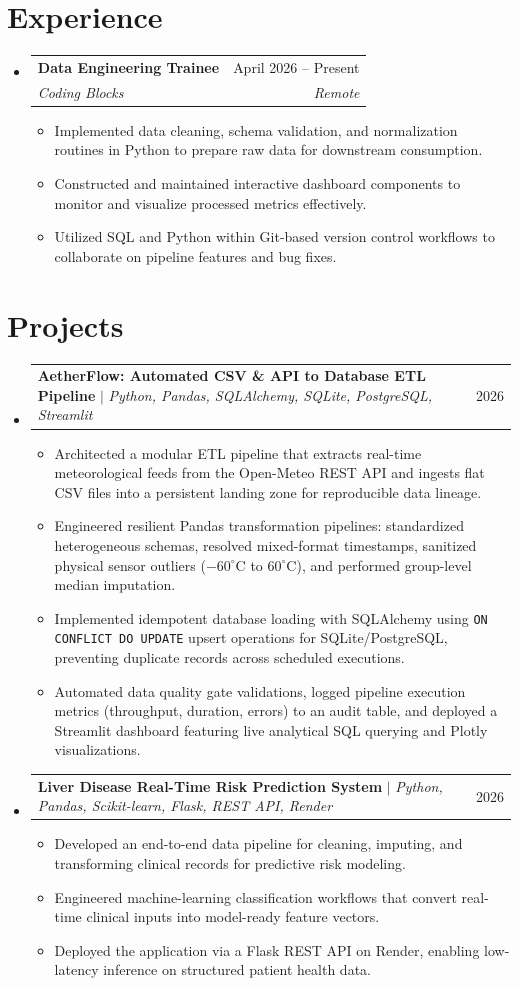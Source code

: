 \documentclass[letterpaper,10pt]{article}
\makeatletter
\newcommand{\resumeItem}[1]{
  \item\small{#1}
}
\newcommand{\resumeSubheading}[4]{
  \item
    \begin{tabular*}{0.98\textwidth}[t]{l@{\extracolsep{\fill}}r}
      \textbf{#1} & \small #2 \\
      \textit{\small#3} & \textit{\small #4} \\
    \end{tabular*}\vspace{-5pt}
}
\newcommand{\resumeProjectHeading}[2]{
    \item
    \begin{tabular*}{0.98\textwidth}{l@{\extracolsep{\fill}}r}
      \small#1 & \small #2 \\
    \end{tabular*}\vspace{-5pt}
}
\newcommand{\resumeSubHeadingListStart}{\begin{itemize}[leftmargin=0.12in, label={}, itemsep=1pt, topsep=1pt, parsep=0pt]}
\newcommand{\resumeSubHeadingListEnd}{\end{itemize}\vspace{-2pt}}
\newcommand{\resumeItemListStart}{\begin{itemize}[leftmargin=0.15in, itemsep=0.5pt, topsep=1pt, parsep=0pt]}
\newcommand{\resumeItemListEnd}{\end{itemize}\vspace{-2pt}}
\makeatother
\begin{document}
\section{Experience}
  \resumeSubHeadingListStart
    \resumeSubheading
      {Data Engineering Trainee}{April 2026 -- Present}
      {Coding Blocks}{Remote}
    \resumeItemListStart
        \resumeItem{Implemented data cleaning, schema validation, and normalization routines in Python to prepare raw data for downstream consumption.}
        \resumeItem{Constructed and maintained interactive dashboard components to monitor and visualize processed metrics effectively.}
        \resumeItem{Utilized SQL and Python within Git-based version control workflows to collaborate on pipeline features and bug fixes.}
    \resumeItemListEnd
  \resumeSubHeadingListEnd

\section{Projects}
    \resumeSubHeadingListStart
    
      \resumeProjectHeading
      {\textbf{AetherFlow: Automated CSV \& API to Database ETL Pipeline} $|$ \emph{Python, Pandas, SQLAlchemy, SQLite, PostgreSQL, Streamlit}}{2026}
          \resumeItemListStart
            \resumeItem{Architected a modular ETL pipeline that extracts real-time meteorological feeds from the Open-Meteo REST API and ingests flat CSV files into a persistent landing zone for reproducible data lineage.}
            \resumeItem{Engineered resilient Pandas transformation pipelines: standardized heterogeneous schemas, resolved mixed-format timestamps, sanitized physical sensor outliers ($-60^\circ\text{C}$ to $60^\circ\text{C}$), and performed group-level median imputation.}
            \resumeItem{Implemented idempotent database loading with SQLAlchemy using \texttt{ON CONFLICT DO UPDATE} upsert operations for SQLite/PostgreSQL, preventing duplicate records across scheduled executions.}
            \resumeItem{Automated data quality gate validations, logged pipeline execution metrics (throughput, duration, errors) to an audit table, and deployed a Streamlit dashboard featuring live analytical SQL querying and Plotly visualizations.}
          \resumeItemListEnd

      \resumeProjectHeading
      {\textbf{Liver Disease Real-Time Risk Prediction System} $|$ \emph{Python, Pandas, Scikit-learn, Flask, REST API, Render}}{2026}
          \resumeItemListStart
            \resumeItem{Developed an end-to-end data pipeline for cleaning, imputing, and transforming clinical records for predictive risk modeling.}
            \resumeItem{Engineered machine-learning classification workflows that convert real-time clinical inputs into model-ready feature vectors.}
            \resumeItem{Deployed the application via a Flask REST API on Render, enabling low-latency inference on structured patient health data.}
          \resumeItemListEnd
    \resumeSubHeadingListEnd
\end{document}
